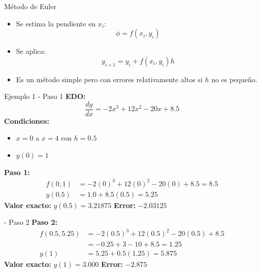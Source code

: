 \documentclass[main.tex]{subfiles}
\begin{document}
\begin{frame}{\small M\'etodo de Euler}
\begin{itemize}
  \item Se estima la pendiente en $x_i$:
  \[
    \phi = f(x_i, y_i)
  \]
  \item Se aplica:
  \[
    y_{i+1} = y_i + f(x_i, y_i) h
  \]
  \item Es un m\'etodo simple pero con errores relativamente altos si $h$ no es peque\~no.
\end{itemize}
\end{frame}

\begin{frame}{\small Ejemplo 1 - Paso 1}
\textbf{EDO:}
\[
  \frac{dy}{dx} = -2x^3 + 12x^2 - 20x + 8.5
\]
\textbf{Condiciones:}
\begin{itemize}
  \item $x=0$ a $x=4$ con $h=0.5$
  \item $y(0)=1$
\end{itemize}
\textbf{Paso 1:}
\begin{align*}
  f(0,1) &= -2(0)^3 + 12(0)^2 - 20(0) + 8.5 = 8.5 \\
  y(0.5) &= 1.0 + 8.5(0.5) = 5.25
\end{align*}
\textbf{Valor exacto:} $y(0.5) = 3.21875$ \hfill \textbf{Error:} $-2.03125$
\end{frame}

\begin{frame}{\small  - Paso 2}
\textbf{Paso 2:}
\begin{align*}
  f(0.5, 5.25) &= -2(0.5)^3 + 12(0.5)^2 - 20(0.5) + 8.5 \\
  &= -0.25 + 3 -10 + 8.5 = 1.25 \\
  y(1) &= 5.25 + 0.5(1.25) = 5.875
\end{align*}
\textbf{Valor exacto:} $y(1) = 3.000$ \hfill \textbf{Error:} $-2.875$
\end{frame}
\end{document}
